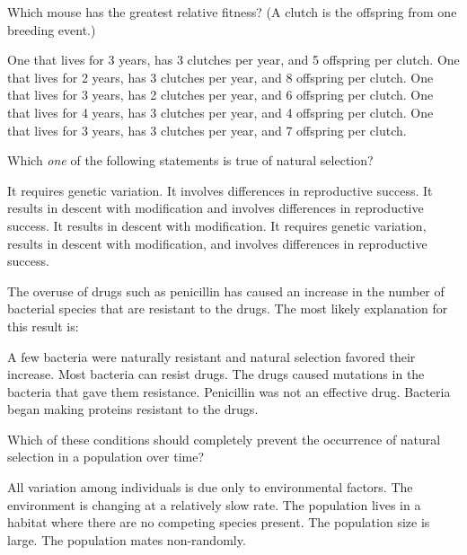 
\question
Which mouse has the greatest relative fitness? (A clutch is the offspring from one breeding event.)

\begin{choices}
\choice One that lives for 3 years, has 3 clutches per year, and 5 offspring per clutch.
\choice One that lives for 2 years, has 3 clutches per year, and 8 offspring per clutch. 
\choice One that lives for 3 years, has 2 clutches per year, and 6 offspring per clutch. 
\choice One that lives for 4 years, has 3 clutches per year, and 4 offspring per clutch.
\correctchoice One that lives for 3 years, has 3 clutches per year, and 7 offspring per clutch. 
\end{choices}

\question
Which \emph{one} of the following statements is true of natural selection?

\begin{choices}
	\choice It requires genetic variation. 
	\choice It involves differences in reproductive success. 
	\choice It results in descent with modification and involves differences in reproductive success. 
	\choice It results in descent with modification. 
	\correctchoice It requires genetic variation, results in descent with modification, and involves differences in reproductive success. 
\end{choices}


\question
The overuse of drugs such as penicillin has caused an increase in the number of bacterial species that are resistant to the drugs. The most likely explanation for this result is:

\begin{choices}
\correctchoice A few bacteria were naturally resistant and natural selection favored their increase. 
\choice Most bacteria can resist drugs. 
\choice The drugs caused mutations in the bacteria that gave them resistance. 
\choice Penicillin was not an effective drug. 
\choice Bacteria began making proteins resistant to the drugs. 
\end{choices}

\question
Which of these conditions should completely prevent the occurrence of natural selection in a population over time?

\begin{choices}
	\correctchoice All variation among individuals is due only to environmental factors. 
	\choice The environment is changing at a relatively slow rate. 
	\choice The population lives in a habitat where there are no competing species present. 
	\choice The population size is large. 
	\choice The population mates non-randomly.
\end{choices}

